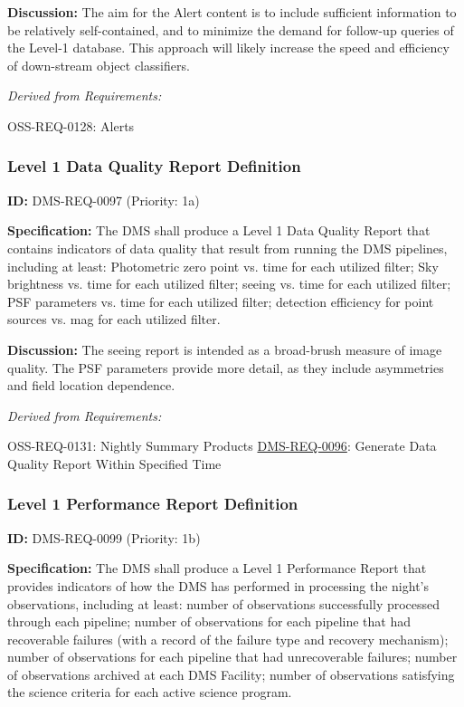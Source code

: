 \documentclass[SE,toc,lsstdraft]{lsstdoc}
\begin{document}
\textbf{Discussion: }The aim for the Alert content is to include sufficient information to be relatively self-contained, and to minimize the demand for follow-up queries of the Level-1 database. This approach will likely increase the speed and efficiency of down-stream object classifiers.

\emph{Derived from Requirements:}

OSS-REQ-0128:
Alerts \newline

\subsubsection{Level 1 Data Quality Report Definition}

\label{DMS-REQ-0097}
\textbf{ID:} DMS-REQ-0097 (Priority: 1a)

\textbf{Specification:} The DMS shall produce a Level 1 Data Quality Report that contains indicators of data quality that result from running the DMS pipelines, including at least: Photometric zero point vs. time for each utilized filter; Sky brightness vs. time for each utilized filter; seeing vs. time for each utilized filter; PSF parameters vs. time for each utilized filter; detection efficiency for point sources vs. mag for each utilized filter.

\textbf{Discussion:} The seeing report is intended as a broad-brush measure of image quality.  The PSF parameters provide more detail, as they include asymmetries and field location dependence.

\emph{Derived from Requirements:}

OSS-REQ-0131:
Nightly Summary Products \newline
\hyperref[DMS-REQ-0096]{DMS-REQ-0096}:
Generate Data Quality Report Within Specified Time \newline

\subsubsection{Level 1 Performance Report Definition}

\label{DMS-REQ-0099}
\textbf{ID:} DMS-REQ-0099 (Priority: 1b)

\textbf{Specification:} The DMS shall produce a Level 1 Performance Report that provides indicators of how the DMS has performed in processing the night's observations, including at least: number of observations successfully processed through each pipeline; number of observations for each pipeline that had recoverable failures (with a record of the failure type and recovery mechanism); number of observations for each pipeline that had unrecoverable failures; number of observations archived at each DMS Facility; number of observations satisfying the science criteria for each active science program.
\end{document}
